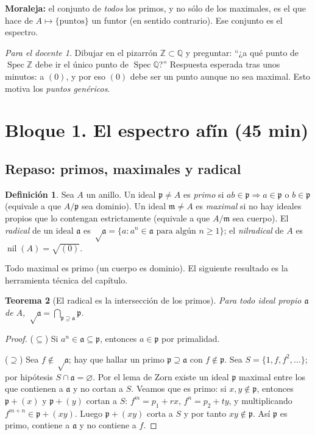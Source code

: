\documentclass[11pt,a4paper]{article}
\newcommand{\Spec}{\operatorname{Spec}}
\newcommand{\nil}{\operatorname{nil}}
\newcommand{\ZZ}{\mathbb{Z}}
\newcommand{\QQ}{\mathbb{Q}}
\newcommand{\pp}{\mathfrak{p}}
\newcommand{\mm}{\mathfrak{m}}
\newcommand{\aaa}{\mathfrak{a}}
\theoremstyle{plain}
\newtheorem{teorema}{Teorema}[section]
\theoremstyle{definition}
\newtheorem{definicion}[teorema]{Definición}
\theoremstyle{remark}
\newtheorem*{docente}{Para el docente}
\newcounter{ej}
\begin{document}
\noindent\textbf{Moraleja:} el conjunto de \emph{todos} los primos, y no sólo de los maximales, es el que hace de $A\mapsto\{\text{puntos}\}$ un funtor (en sentido contrario). Ese conjunto es el espectro.

\begin{docente}
Dibujar en el pizarrón $\ZZ\subset\QQ$ y preguntar: ``¿a qué punto de $\Spec\ZZ$ debe ir el único punto de $\Spec\QQ$?'' Respuesta esperada tras unos minutos: a $(0)$, y por eso $(0)$ debe ser un punto aunque no sea maximal. Esto motiva los \emph{puntos genéricos}.
\end{docente}

\section{Bloque 1. El espectro afín (45 min)}

\subsection{Repaso: primos, maximales y radical}

\begin{definicion}
Sea $A$ un anillo. Un ideal $\pp\ne A$ es \emph{primo} si $ab\in\pp\Rightarrow a\in\pp$ o $b\in\pp$ (equivale a que $A/\pp$ sea dominio). Un ideal $\mm\ne A$ es \emph{maximal} si no hay ideales propios que lo contengan estrictamente (equivale a que $A/\mm$ sea cuerpo). El \emph{radical} de un ideal $\aaa$ es $\sqrt\aaa=\{a:a^n\in\aaa\text{ para algún }n\ge1\}$; el \emph{nilradical} de $A$ es $\nil(A)=\sqrt{(0)}$.
\end{definicion}

Todo maximal es primo (un cuerpo es dominio). El siguiente resultado es la herramienta técnica del capítulo.

\begin{teorema}[{El radical es la intersección de los primos}]\label{teo:radical}
Para todo ideal propio $\aaa$ de $A$, $\sqrt\aaa=\bigcap_{\pp\supseteq\aaa}\pp$.
\end{teorema}
\begin{proof}
($\subseteq$) Si $a^n\in\aaa\subseteq\pp$, entonces $a\in\pp$ por primalidad.

($\supseteq$) Sea $f\notin\sqrt\aaa$; hay que hallar un primo $\pp\supseteq\aaa$ con $f\notin\pp$. Sea $S=\{1,f,f^2,\dots\}$; por hipótesis $S\cap\aaa=\varnothing$. Por el lema de Zorn existe un ideal $\pp$ maximal entre los que contienen a $\aaa$ y no cortan a $S$. Veamos que es primo: si $x,y\notin\pp$, entonces $\pp+(x)$ y $\pp+(y)$ cortan a $S$: $f^m=p_1+rx$, $f^n=p_2+ty$, y multiplicando $f^{m+n}\in\pp+(xy)$. Luego $\pp+(xy)$ corta a $S$ y por tanto $xy\notin\pp$. Así $\pp$ es primo, contiene a $\aaa$ y no contiene a $f$.
\end{proof}
\end{document}
